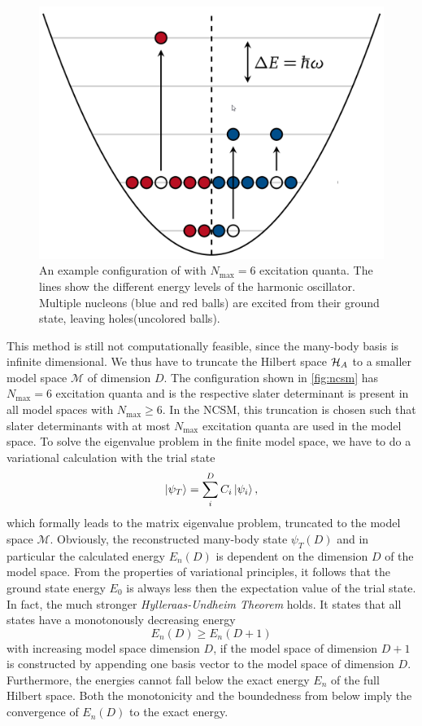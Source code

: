 \begin{figure}
  \includegraphics[width=.4\textwidth]{media/ncsm.png}
  \caption{An example configuration of  with $N_\mathrm{max} = 6$ excitation quanta. The lines show the different energy levels of the harmonic oscillator. Multiple nucleons (blue and red balls) are excited from their ground state, leaving holes(uncolored balls).}
  \label{fig:ncsm}
\end{figure}
This method is still not computationally feasible, since the many-body basis is infinite dimensional. We thus have to truncate the Hilbert space $\mathcal{H}_A$ to a smaller model space $\mathcal{M}$ of dimension $D$. The  configuration shown in \autoref{fig:ncsm} has $N_\mathrm{max} = 6$ excitation quanta and is the respective slater determinant is present in all model spaces with $N_\mathrm{max} \geq 6$. In the NCSM, this truncation is chosen such that slater determinants with at most $N_\mathrm{max}$ excitation quanta are used in the model space.
To solve the eigenvalue problem in the finite model space, we have to do a variational calculation with the trial state
\begin{equation}
  \ket{\psi_T} = \sum_i^{D} C_i \ket{\psi_i},
\end{equation}
which formally leads to the matrix eigenvalue problem, truncated to the model space $\mathcal{M}$. Obviously, the reconstructed many-body state $\psi_T(D)$ and in particular the calculated energy $E_n(D)$ is dependent on the dimension $D$ of the model space. From the properties of variational principles, it follows that the ground state energy $E_0$ is always less then the expectation value of the trial state. In fact, the much stronger \textit{Hylleraas-Undheim Theorem} holds. It states that all states have a monotonously decreasing energy
\begin{equation}
  E_n(D) \geq E_n(D+1)
\end{equation}
with increasing model space dimension $D$, if the model space of dimension $D+1$ is constructed by appending one basis vector to the model space of dimension $D$. Furthermore, the energies cannot fall below the exact energy $E_n$ of the full Hilbert space. Both the monotonicity and the boundedness from below imply the convergence of $E_n(D)$ to the exact energy.

